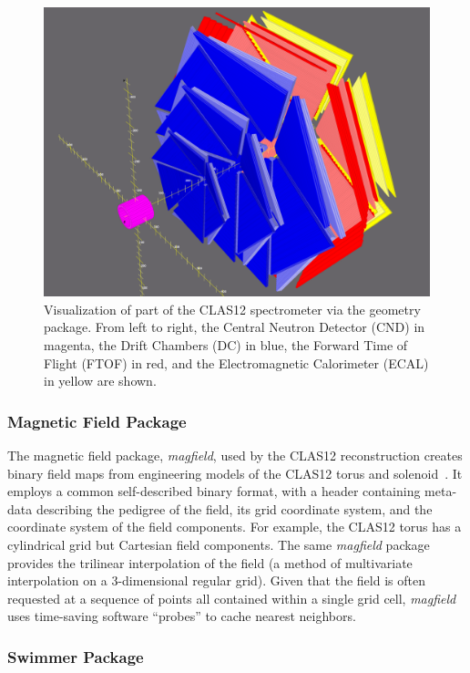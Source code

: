 \begin{figure}
\centering
\includegraphics[width=1.0\columnwidth]{pics/detectorview.png}
\caption{Visualization of part of the CLAS12 spectrometer via the geometry package. From left to right, the Central
  Neutron Detector (CND) in magenta, the Drift Chambers (DC) in blue, the Forward Time of Flight (FTOF) in red,
  and the Electromagnetic Calorimeter (ECAL) in yellow are shown.}
\label{fig:detectorview}
\end{figure}

\subsubsection{Magnetic Field Package}

The magnetic field package, {\it magfield}, used by the CLAS12 reconstruction creates binary field maps from
engineering models of the CLAS12 torus and solenoid~\cite{magnets-nim}. It employs a common self-described
binary format, with a header containing meta-data describing the pedigree of the field, its grid coordinate system,
and the coordinate system of the field components. For example, the CLAS12 torus has a cylindrical grid but
Cartesian field components. The same {\it magfield} package provides the trilinear interpolation of the field (a
method of multivariate interpolation on a 3-dimensional regular grid). Given that the field is often requested at a
sequence of points all contained within a single grid cell, {\it magfield} uses time-saving software “probes” to cache
nearest neighbors.

\subsubsection{Swimmer Package}

